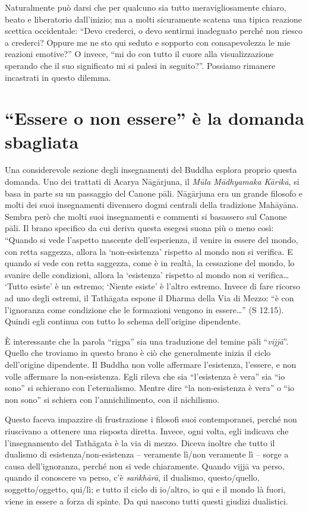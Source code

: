 Naturalmente può darsi che per qualcuno sia tutto meravigliosamente chiaro, beato e liberatorio dall'inizio; ma a molti sicuramente scatena una tipica reazione scettica occidentale: ``Devo crederci, o devo sentirmi inadeguato perché non riesco a crederci? Oppure me ne sto qui seduto e sopporto con consapevolezza le mie reazioni emotive?'' O invece, ``mi do con tutto il cuore alla visualizzazione sperando che il suo significato mi si palesi in seguito?''. Possiamo rimanere incastrati in questo dilemma.

\section*{``Essere o non essere'' \`e la domanda sbagliata}

Una considerevole sezione degli insegnamenti del Buddha esplora proprio questa domanda. Uno dei trattati di Acarya Nāgārjuna, il \textit{Mūla Mādhyamaka Kārikā}, si basa in parte su un passaggio del Canone pāli. Nāgārjuna era un grande filosofo e molti dei suoi insegnamenti divennero dogmi centrali della tradizione Mahāyāna. Sembra però che molti suoi insegnamenti e commenti si basassero sul Canone pāli. Il brano specifico da cui deriva questa esegesi suona più o meno così: ``Quando si vede l'aspetto nascente dell'esperienza, il venire in essere del mondo, con retta saggezza, allora la `non-esistenza' rispetto al mondo non si verifica. E quando si vede con retta saggezza, come è in realtà, la cessazione del mondo, lo svanire delle condizioni, allora la `esistenza' rispetto al mondo non si verifica\ldots{} `Tutto esiste' è un estremo; `Niente esiste' è l'altro estremo. Invece di fare ricorso ad uno degli estremi, il Tathāgata espone il Dharma della Via di Mezzo: ``è con l'ignoranza come condizione che le formazioni vengono in essere\ldots{}'' (S 12.15). Quindi egli continua con tutto lo schema dell'origine dipendente.

È interessante che la parola ``rigpa'' sia una traduzione del temine pāli ``\textit{vijjā}''. Quello che troviamo in questo brano è ciò che generalmente inizia il ciclo dell'origine dipendente. Il Buddha non volle affermare l'esistenza, l'essere, e non volle affermare la non-esistenza. Egli rileva che sia ``l'esistenza è vera'' sia ``io sono'' si schierano con l'eternalismo. Mentre dire ``la non-esistenza è vera'' o ``io non sono'' si schiera con l'annichilimento, con il nichilismo.

Questo faceva impazzire di frustrazione i filosofi suoi contemporanei, perché non riuscivano a ottenere una risposta diretta. Invece, ogni volta, egli indicava che l'insegnamento del Tathāgata è la via di mezzo. Diceva inoltre che tutto il dualismo di esistenza/non-esistenza -- veramente lì/non veramente lì -- sorge a causa dell'ignoranza, perché non si vede chiaramente. Quando vijjā va perso, quando il conoscere va perso, c'è \textit{saṅkhārā}, il dualismo, questo/quello, soggetto/oggetto, qui/lì; e tutto il ciclo di io/altro, io qui e il mondo là fuori, viene in essere a forza di spinte. Da qui nascono tutti questi giudizi dualistici.

